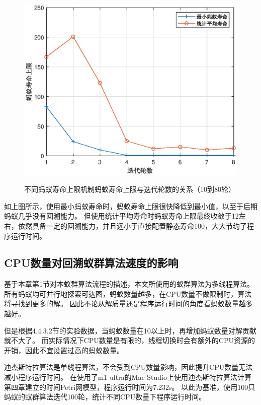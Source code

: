 \begin{figure}[H]
	\centering
	\includegraphics[scale=1.00,angle=0]{figures/test4.eps}\\
	\caption{不同蚂蚁寿命上限机制蚂蚁寿命上限与迭代轮数的关系（10到80轮）}
\end{figure}

如上图所示，使用最小蚂蚁寿命时，蚂蚁寿命上限很快降低到最小值，以至于后期蚂蚁几乎没有回溯能力。
但使用统计平均寿命时蚂蚁寿命上限最终收敛于12左右，依然具备一定的回溯能力，并且远小于直接配置静态寿命100，大大节约了程序运行时间。

\subsection{CPU数量对回溯蚁群算法速度的影响}
基于本章第1节对本蚁群算法流程的描述，本文所使用的蚁群算法为多线程算法。
所有蚂蚁均可并行地探索可达图，蚂蚁数量越多，在CPU数量不做限制时，算法将寻找到更多的解。
因此不论从解质量还是程序运行时间的角度看蚂蚁数量越多越好。

但是根据4.4.3.2节的实验数据，当蚂蚁数量在10以上时，再增加蚂蚁数量对解贡献就不大了。
而实际情况下CPU数量是有限的，线程切换时会有额外的CPU资源的开销，因此不宜设置过高的蚂蚁数量。

迪杰斯特拉算法是单线程算法，不会受到CPU数量影响，因此提升CPU数量无法减小程序运行时间。
在使用了m1 ultra的Mac Studio上使用迪杰斯特拉算法计算第四章建立的时间Petri网模型，程序运行时间为7.232s。
以此为基准，使用100只蚂蚁的蚁群算法迭代100轮，统计不同CPU数量下程序运行时间。

